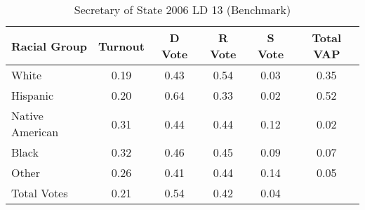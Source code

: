 \begin{table}[htb]
\begin{center}
\caption{Secretary of State 2006 LD 13 (Benchmark)}
\label{sos06_vap_ld_13_benchmark}
\begin{tabular}{lccccc}
  \hline
Racial Group & Turnout & D Vote & R Vote & S Vote & Total VAP \\ 
  \hline
White & 0.19 & 0.43 & 0.54 & 0.03 & 0.35 \\ 
  Hispanic & 0.20 & 0.64 & 0.33 & 0.02 & 0.52 \\ 
  Native American & 0.31 & 0.44 & 0.44 & 0.12 & 0.02 \\ 
  Black & 0.32 & 0.46 & 0.45 & 0.09 & 0.07 \\ 
  Other & 0.26 & 0.41 & 0.44 & 0.14 & 0.05 \\ 
  Total Votes & 0.21 & 0.54 & 0.42 & 0.04 &  \\ 
   \hline
\end{tabular}
\end{center}
\end{table}

